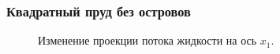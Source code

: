 \documentclass[10pt,utf8,presentation,compress]{beamer}
\begin{document}
\begin{frame}
\frametitle{Квадратный пруд без островов}
	\begin{figure}[H]
		\centering
		\hfill
		\hfill
		\caption{Изменение проекции потока жидкости на ось $x_1$.}
	\end{figure}
\end{frame}
\end{document}
